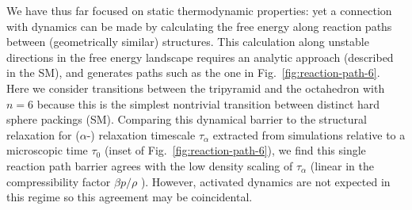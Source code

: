 \documentclass[11pt,twoside]{report}
\begin{document}
We have thus far focused on static thermodynamic properties: yet a connection with dynamics can be made by calculating the free energy along reaction paths between (geometrically similar) structures.
This calculation along unstable directions in the free energy landscape requires an analytic approach (described in the SM), and generates paths such as the one in Fig.\ \ref{fig:reaction-path-6}.
Here we consider transitions between the tripyramid and the octahedron with $n=6$ because this is the simplest nontrivial transition between distinct hard sphere packings (SM).
Comparing this dynamical barrier to the structural relaxation for ($\alpha$-) relaxation timescale $\tau_\alpha$ extracted from simulations relative to a microscopic time $\tau_0$ (inset of Fig.\ \ref{fig:reaction-path-6}), we find this single reaction path barrier agrees with the low density scaling of $\tau_\alpha$ (linear in the compressibility factor $\beta p / \rho$ \cite{BerthierPRE2009}).
However, activated dynamics are not expected in this regime so this agreement may be coincidental.
\end{document}
